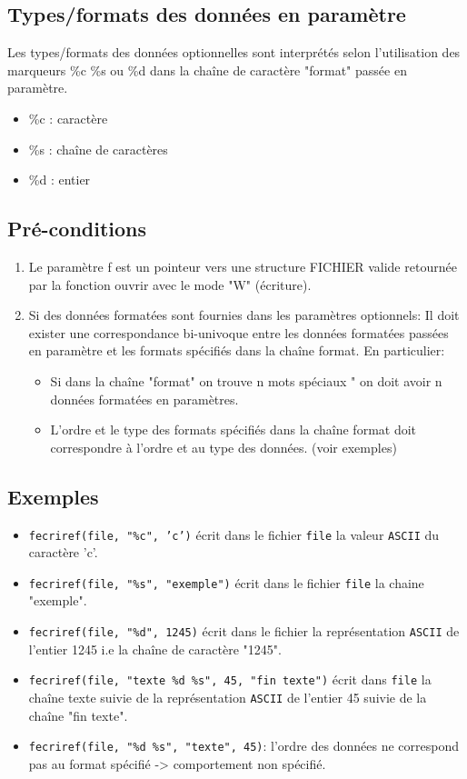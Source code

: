 \documentclass[11pt]{article}
\theoremstyle{definition}
\theoremstyle{definition}
\begin{document}
\subsection{Types/formats des données en paramètre}
Les types/formats des données optionnelles sont interprétés selon
l'utilisation des marqueurs \%c \%s ou \%d dans la chaîne de caractère "format"
passée en paramètre.
\begin{itemize}
\item \%c : caractère
\item \%s : chaîne de caractères
\item \%d : entier
\end{itemize}

\subsection{Pré-conditions}
\begin{enumerate}
\item Le paramètre f est un pointeur vers une structure FICHIER valide retournée par
la fonction ouvrir avec le mode "W" (écriture).
\item Si des données formatées sont fournies dans les paramètres optionnels:
  Il doit exister une correspondance bi-univoque entre les données formatées
  passées en paramètre et les formats spécifiés dans la chaîne format.
  En particulier:
  \begin{itemize}
  \item Si dans la chaîne "format" on trouve n mots spéciaux "%
    on doit avoir n données formatées en paramètres.
  \item L'ordre et le type des formats spécifiés dans la chaîne format doit correspondre
    à l'ordre et au type des données. (voir exemples)
  \end{itemize}
\end{enumerate}

\subsection{Exemples}
\begin{itemize}
\item \texttt{fecriref(file, "\%c", 'c')} écrit dans le fichier \texttt{file} la valeur \texttt{ASCII}
  du caractère 'c'.
\item \texttt{fecriref(file, "\%s", "exemple")} écrit dans le fichier \texttt{file}
  la chaine "exemple".
\item \texttt{fecriref(file, "\%d", 1245)} écrit dans le fichier la représentation \texttt{ASCII}
  de l'entier 1245 i.e la chaîne de caractère "1245".
\item \texttt{fecriref(file, "texte \%d \%s", 45, "fin texte")} écrit dans \texttt{file} la chaîne texte
  suivie de la représentation \texttt{ASCII} de l'entier 45 suivie de la chaîne "fin texte".
\item \texttt{fecriref(file, "\%d \%s", "texte", 45)}: l'ordre des données ne correspond pas
  au format spécifié -> comportement non spécifié.
\end{itemize}
\end{document}
